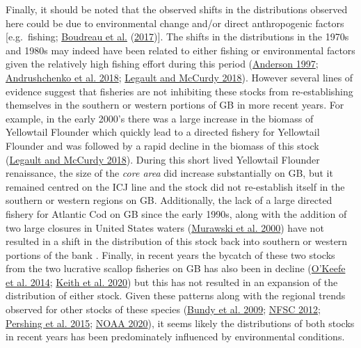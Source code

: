 \documentclass[
]{article}
\begin{document}
Finally, it should be noted that the observed shifts in the distributions observed here could be due to environmental change and/or direct anthropogenic factors {[}e.g.~fishing; \protect\hyperlink{ref-boudreauConnectivityPersistenceLoss2017}{Boudreau et al.} (\protect\hyperlink{ref-boudreauConnectivityPersistenceLoss2017}{2017}){]}. The shifts in the distributions in the 1970s and 1980s may indeed have been related to either fishing or environmental factors given the relatively high fishing effort during this period (\protect\hyperlink{ref-andersonHistoryFisheriesManagement1997}{Anderson 1997}; \protect\hyperlink{ref-andrushchenkoAssessmentEasternGeorges2018}{Andrushchenko et al. 2018}; \protect\hyperlink{ref-legaultStockAssessmentGeorges2018}{Legault and McCurdy 2018}). However several lines of evidence suggest that fisheries are not inhibiting these stocks from re-establishing themselves in the southern or western portions of GB in more recent years. For example, in the early 2000's there was a large increase in the biomass of Yellowtail Flounder which quickly lead to a directed fishery for Yellowtail Flounder and was followed by a rapid decline in the biomass of this stock (\protect\hyperlink{ref-legaultStockAssessmentGeorges2018}{Legault and McCurdy 2018}). During this short lived Yellowtail Flounder renaissance, the size of the \emph{core area} did increase substantially on GB, but it remained centred on the ICJ line and the stock did not re-establish itself in the southern or western regions on GB. Additionally, the lack of a large directed fishery for Atlantic Cod on GB since the early 1990s, along with the addition of two large closures in United States waters (\protect\hyperlink{ref-murawskiLargescaleClosedAreas2000}{Murawski et al. 2000}) have not resulted in a shift in the distribution of this stock back into southern or western portions of the bank . Finally, in recent years the bycatch of these two stocks from the two lucrative scallop fisheries on GB has also been in decline (\protect\hyperlink{ref-okeefeEvaluatingEffectivenessTime2014a}{O'Keefe et al. 2014}; \protect\hyperlink{ref-keithEvaluatingSocioeconomicConservation2020}{Keith et al. 2020}) but this has not resulted in an expansion of the distribution of either stock. Given these patterns along with the regional trends observed for other stocks of these species (\protect\hyperlink{ref-bundySealsCodForage2009}{Bundy et al. 2009}; \protect\hyperlink{ref-nfsc54thNortheastRegional2012}{NFSC 2012}; \protect\hyperlink{ref-pershingSlowAdaptationFace2015}{Pershing et al. 2015}; \protect\hyperlink{ref-NOAAYellowtailFlounder2020}{NOAA 2020}), it seems likely the distributions of both stocks in recent years has been predominately influenced by environmental conditions.
\end{document}
